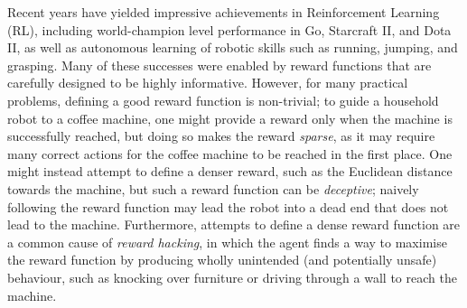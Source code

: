 \documentclass{nature}
\renewcommand*{\cite}[1]{\supercite{#1}}
\begin{document}
Recent years have yielded impressive achievements in Reinforcement Learning (RL), including world-champion level performance in Go\cite{Silver2017MasteringTG}, Starcraft II\cite{vinyals2019grandmaster}, and Dota II\cite{berner2019dota}, as well as autonomous learning of robotic skills such as running, jumping, and grasping\cite{merel2018hierarchical, andrychowicz2020learning}.
Many of these successes were enabled by reward functions that are 
carefully designed to be highly informative.
However, for many practical problems, defining a good reward function is non-trivial;
to guide a household robot to a coffee machine, one might provide a reward only when the machine is successfully
reached, but doing so makes the reward \emph{sparse}, as it may require many correct actions for the coffee machine to be reached in the first place.
One might instead attempt to define a denser reward, such as the Euclidean distance towards the machine, but such a reward function can be \emph{deceptive}; naively following the reward function may lead the robot into a dead end that does not lead to the machine.
Furthermore, attempts to define a dense reward function are a common cause of \emph{reward hacking}, in which the agent finds a way to maximise the reward function by producing wholly unintended (and potentially unsafe) behaviour\cite{Lehman2018TheSC,Amodei2016ConcretePI}, such as knocking over furniture or driving through a wall to reach the machine.
\end{document}
